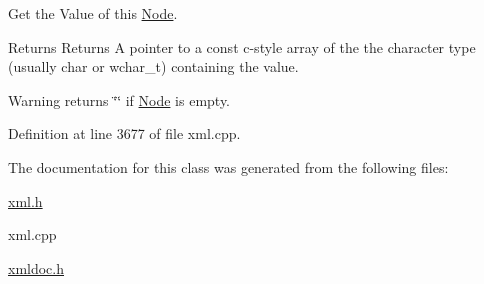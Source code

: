 Get the Value of this \hyperlink{classphys_1_1xml_1_1Node}{Node}. 

\begin{DoxyReturn}{Returns}
Returns A pointer to a const c-\/style array of the the character type (usually char or wchar\_\-t) containing the value. 
\end{DoxyReturn}
\begin{DoxyWarning}{Warning}
returns \char`\"{}\char`\"{} if \hyperlink{classphys_1_1xml_1_1Node}{Node} is empty. 
\end{DoxyWarning}


Definition at line 3677 of file xml.cpp.



The documentation for this class was generated from the following files:\begin{DoxyCompactItemize}
\item 
\hyperlink{xml_8h}{xml.h}\item 
xml.cpp\item 
\hyperlink{xmldoc_8h}{xmldoc.h}\end{DoxyCompactItemize}
